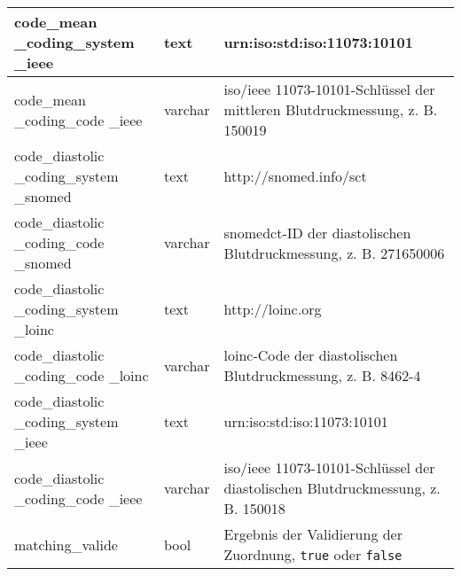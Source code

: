 \begin{longtable}{|p{3.5cm}|l|p{6.5cm}|}
		code\_mean \_coding\_system \_ieee & text & urn:iso:std:iso:11073:10101 \\ \hline
		code\_mean \_coding\_code \_ieee & varchar & \ac{iso}/\ac{ieee} 11073-10101\texttrademark{}-Schlüssel der mittleren Blutdruckmessung, z. B. 150019 \\ \hline
		code\_diastolic \_coding\_system \_snomed & text & http://snomed.info/sct \\ \hline
		code\_diastolic \_coding\_code \_snomed & varchar & \ac{snomedct}-ID der diastolischen Blutdruckmessung, z. B. 271650006 \\ \hline
		code\_diastolic \_coding\_system \_loinc & text & http://loinc.org \\ \hline
		code\_diastolic \_coding\_code \_loinc & varchar & \ac{loinc}-Code der diastolischen Blutdruckmessung, z. B. 8462-4 \\ \hline
		code\_diastolic \_coding\_system \_ieee & text & urn:iso:std:iso:11073:10101 \\ \hline
		code\_diastolic \_coding\_code \_ieee & varchar & \ac{iso}/\ac{ieee} 11073-10101\texttrademark{}-Schlüssel der diastolischen Blutdruckmessung, z. B. 150018 \\ \hline
		matching\_valide & bool & Ergebnis der Validierung der Zuordnung, \texttt{true} oder \texttt{false} \\ \hline
\end{longtable}

